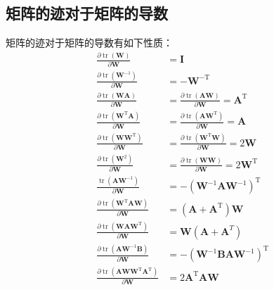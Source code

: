 \documentclass[UTF8,space=auto]{ctexart} %
\begin{document}
\subsection{矩阵的迹对于矩阵的导数}
矩阵的迹对于矩阵的导数有如下性质：
\begin{align}
\frac{\partial \operatorname{tr}(\mathbf{W})}{\partial \mathbf{W}}&=\mathbf{I} \\
\frac{\partial \operatorname{tr}\left(\mathbf{W}^{-1}\right)}{\partial \mathbf{W}} &= - \mathbf{W}^{-\mathrm{T}} \\
\frac{\partial \operatorname{tr}(\mathbf{W} \mathbf{A})}{\partial \mathbf{W}}&=\frac{\partial \operatorname{tr}(\mathbf{A} \mathbf{W})}{\partial \mathbf{W}}=\mathbf{A}^{\mathrm{T}} \\
\frac{\partial \operatorname{tr}\left(\mathbf{W}^{\mathrm{T}} \mathbf{A}\right)}{\partial \mathbf{W}}&=\frac{\partial \operatorname{tr}\left(\mathbf{A} \mathbf{W}^{\mathrm{T}}\right)}{\partial \mathbf{W}}=\mathbf{A} \\
\frac{\partial \operatorname{tr}\left(\mathbf{W} \mathbf{W}^{\mathrm{T}}\right)}{\partial \mathbf{W}}&=\frac{\partial \operatorname{tr}\left(\mathbf{W}^{\mathrm{T}} \mathbf{W}\right)}{\partial \mathbf{W}}=2 \mathbf{W} \\
\frac{\partial \operatorname{tr}\left(\mathbf{W}^{2}\right)}{\partial \mathbf{W}}&=\frac{\partial \operatorname{tr}(\mathbf{W} \mathbf{W})}{\partial \mathbf{W}}=2 \mathbf{W}^{\mathrm{T}} \\
\frac{\operatorname{tr}\left(\mathbf{A} \mathbf{W}^{-1}\right)}{\partial \mathbf{W}}&=-\left(\mathbf{W}^{-1} \mathbf{A} \mathbf{W}^{-1}\right)^{\mathrm{T}} \\
\frac{\partial \operatorname{tr}\left(\mathbf{W}^{\mathrm{T}} \mathbf{A} \mathbf{W}\right)}{\partial \mathbf{W}}&=\left(\mathbf{A}+\mathbf{A}^{\mathrm{T}}\right) \mathbf{W} \\
\frac{\partial \operatorname{tr}\left(\mathbf{W} \mathbf{A} \mathbf{W}^{\mathrm{T}}\right)}{\partial \mathbf{W}}&=\mathbf{W}\left(\mathbf{A}+\mathbf{A}^{T}\right) \\
\frac{\partial \operatorname{tr}\left(\mathbf{A} \mathbf{W}^{-1} \mathbf{B}\right)}{\partial \mathbf{W}}&=-\left(\mathbf{W}^{-1} \mathbf{B} \mathbf{A} \mathbf{W}^{-1}\right)^{\mathrm{T}} \\
\frac{\partial \operatorname{tr}\left(\mathbf{A} \mathbf{W} \mathbf{W}^{\mathrm{T}} \mathbf{A}^{\mathrm{T}}\right)}{\partial \mathbf{W}}&=2 \mathbf{A}^{\mathrm{T}} \mathbf{A} \mathbf{W} \\

\end{align}
\end{document}
